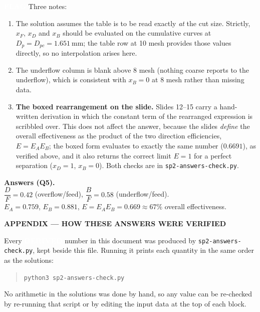 \documentclass[10pt,a4paper]{article}
\newcommand{\chip}[2]{{\setlength{\fboxsep}{3pt}%
  \colorbox{#1}{\textcolor{white}{\bfseries\footnotesize #2}}}}
\newcommand{\DERIVED}{\chip{devcol}{DERIVED}}
\newcommand{\FLAGTAG}{\chip{flagcol}{FLAG}}
\newcommand{\spsection}[1]{%
  \par\addvspace{10pt}%
  \noindent\begin{tcolorbox}[colback=accent,colframe=accent,boxrule=0pt,arc=1.2pt,
      left=7pt,right=7pt,top=5pt,bottom=5pt,width=\linewidth,before skip=0pt,after skip=7pt]
    \color{white}\bfseries\large #1
  \end{tcolorbox}\par\vspace{-2pt}\nopagebreak}
\newcommand{\spsub}[1]{\par\addvspace{7pt}\noindent{\color{accent}\bfseries #1}\par\addvspace{3pt}\nopagebreak}
\begin{document}
\begin{flagres}
\FLAGTAG{} Three notes:
\begin{enumerate}
  \item The solution assumes the table is to be read exactly \emph{at} the cut size. Strictly, $x_F$,
        $x_D$ and $x_B$ should be evaluated on the cumulative curves at $D_p=D_{pc}=\SI{1.651}{\milli\meter}$;
        the table row at 10 mesh provides those values directly, so no interpolation arises here.
  \item The underflow column is blank above 8 mesh (nothing coarse reports to the underflow), which is
        consistent with $x_B=0$ at 8 mesh rather than missing data.
  \item \textbf{The boxed rearrangement on the slide.} Slides 12--15 carry a hand-written derivation
        in which the constant term of the rearranged expression is scribbled over. This does not affect
        the answer, because the slides \emph{define} the overall effectiveness as the product of the
        two direction efficiencies, $E=E_AE_B$; the boxed form evaluates to exactly the same number
        ($0.6691$), as verified above, and it also returns the correct limit $E=1$ for a perfect
        separation ($x_D=1$, $x_B=0$). Both checks are in \texttt{sp2-answers-check.py}.
\end{enumerate}
\end{flagres}

\begin{ansbox}
\textbf{Answers (Q5).}\\
$\dfrac{D}{F}=0.42$ (overflow/feed), \quad $\dfrac{B}{F}=0.58$ (underflow/feed).\\
$E_A=0.759$, \quad $E_B=0.881$, \quad
$\boxed{E=E_A E_B = 0.669 \approx 67\%}$ overall effectiveness.
\end{ansbox}

\newpage
\spsection{APPENDIX --- HOW THESE ANSWERS WERE VERIFIED}

\spsub{Reproducibility}
Every \DERIVED{} number in this document was produced by \texttt{sp2-answers-check.py}, kept beside this
file. Running it prints each quantity in the same order as the solutions:
\begin{quote}\small
\texttt{python3 sp2-answers-check.py}
\end{quote}
No arithmetic in the solutions was done by hand, so any value can be re-checked by re-running that script
or by editing the input data at the top of each block.
\end{document}

